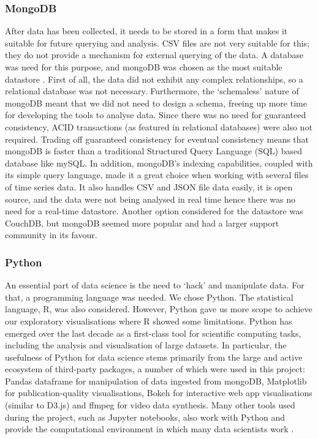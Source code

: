 \documentclass[fleqn,10pt]{SelfArx} %
\begin{document}
\subsubsection{MongoDB}
After data has been collected, it needs to be stored in a form that makes it suitable for future  querying and analysis. CSV files are not very suitable for this; they do not provide a mechanism for external querying of the data. A database was need for this purpose, and mongoDB was chosen as the most suitable datastore \cite{mongo2014}. First of all, the data did not exhibit any complex relationships, so a relational database was not necessary. Furthermore, the ‘schemaless’ nature of mongoDB meant that we did not need to design a schema, freeing up more time for developing the tools to analyse data. Since there was no need for guaranteed consistency, ACID transactions (as featured in relational databases) were also not required. Trading off guaranteed consistency for eventual consistency means that mongoDB is faster than a traditional Structured Query Language (SQL) based database like mySQL. In addition, mongoDB’s indexing capabilities, coupled with its simple query language, made it a great choice when working with several files of time series data. It also handles CSV and JSON file data easily, it is open source, and the data were not being analysed in real time hence there was no need for a real-time datastore. Another option considered for the datastore was CouchDB, but mongoDB seemed more popular and had a larger support community in its favour.  \\

\subsubsection{Python}
An essential part of data science is the need to ‘hack’ and manipulate data. For that, a programming language was needed. We chose Python. The statistical language, R, was also considered. However, Python gave us more scope to achieve our exploratory visualisations where R showed some limitations.  Python has emerged over the last decade as a first-class tool for scientific computing tasks, including the analysis and visualisation of large datasets. In particular, the usefulness of Python for data science stems primarily from the large and active ecosystem of third-party packages, a number of which were used in this project: Pandas dataframe for manipulation of data ingested from mongoDB, Matplotlib for publication-quality visualisations, Bokeh for interactive web app visualisations (similar to D3.js) and ffmpeg for video data synthesis. Many other tools used during the project, such as Jupyter notebooks, also work with Python and provide the computational environment in which many data scientists work \cite{Vanderplas17}. \\
\end{document}
